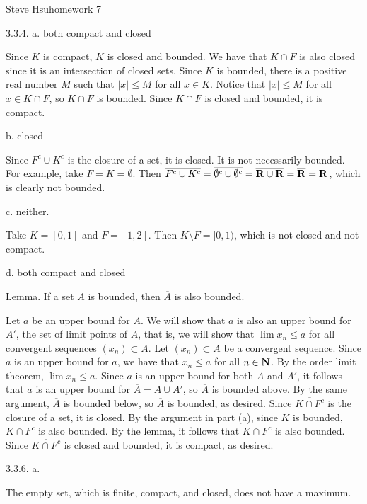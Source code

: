 \def\abs#1{\vert#1\vert}
\def\real{{\bf R}}
\def\natural{{\bf N}}
\centerline{Steve Hsu\hfill homework 7}
\item{3.3.4.} a. both compact and closed

Since $K$ is compact, $K$ is closed and bounded.
We have that $K \cap F$ is also closed since
it is an intersection of closed sets.
Since $K$ is bounded, there is a positive real number $M$
such that $\abs x \le M$ for all $x \in K$.
Notice that $\abs x \le M$ for all $x \in K \cap F$,
so $K \cap F$ is bounded.
Since $K \cap F$ is closed and bounded, it is compact.
\medskip
\item{} b. closed

Since $\overline{F^c \cup K^c}$ is the closure of a set, it is closed.
It is not necessarily bounded.
For example, take $F = K = \emptyset$.
Then $\overline{F^c \cup K^c} = \overline{\emptyset^c \cup \emptyset^c} =
\overline{\real \cup \real} = \overline{\real} = \real$,
which is clearly not bounded.
\medskip
\item{} c. neither.

Take $K = [0,1]$ and $F = [1,2]$.
Then $K \setminus F = [0,1)$, which is not closed and not compact.
\medskip
\item{} d. both compact and closed

\proclaim Lemma. If a set $A$ is bounded, then $\overline A$ is also bounded.

Let $a$ be an upper bound for $A$.
We will show that $a$ is also an upper bound for $A'$,
the set of limit points of $A$,
that is, we will show that $\lim x_n \le a$
for all convergent sequences $(x_n) \subset A$.
Let $(x_n) \subset A$ be a convergent sequence.
Since $a$ is an upper bound for $a$,
we have that $x_n \le a$ for all $n \in \natural$.
By the order limit theorem, $\lim x_n \le a$.
Since $a$ is an upper bound for both $A$ and $A'$,
it follows that $a$ is an upper bound for $\overline A = A \cup A'$,
so $\overline A$ is bounded above.
By the same argument, $\overline A$ is bounded below,
so $\overline A$ is bounded, as desired.
\smallskip
Since $\overline{K \cap F^c}$ is the closure of a set, it is closed.
By the argument in part (a), since $K$ is bounded,
$K \cap F^c$ is also bounded.
By the lemma, it follows that $\overline{K \cap F^c}$ is also bounded.
Since $\overline{K \cap F^c}$ is closed and bounded,
it is compact, as desired.
\bigskip
\item{3.3.6.} a.

The empty set, which is finite, compact, and closed, does not have a maximum.

